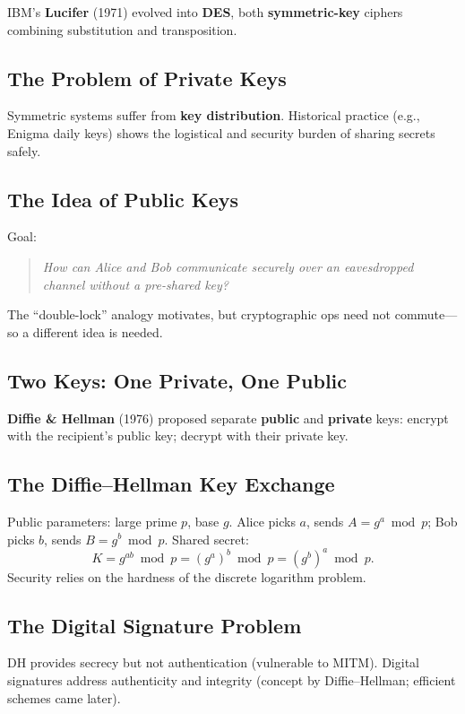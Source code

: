IBM’s \textbf{Lucifer} (1971) evolved into \textbf{DES}, both \textbf{symmetric-key} ciphers combining substitution and transposition.

\subsection{The Problem of Private Keys}

Symmetric systems suffer from \textbf{key distribution}. Historical practice (e.g., Enigma daily keys) shows the logistical and security burden of sharing secrets safely.

\subsection{The Idea of Public Keys}

Goal:
\begin{quote}
\textit{How can Alice and Bob communicate securely over an eavesdropped channel without a pre-shared key?}
\end{quote}
The “double-lock” analogy motivates, but cryptographic ops need not commute—so a different idea is needed.

\subsection{Two Keys: One Private, One Public}

\textbf{Diffie \& Hellman} (1976) proposed separate \textbf{public} and \textbf{private} keys: encrypt with the recipient’s public key; decrypt with their private key.

\subsection{The Diffie–Hellman Key Exchange}

Public parameters: large prime \(p\), base \(g\). Alice picks \(a\), sends \(A=g^a\bmod p\); Bob picks \(b\), sends \(B=g^b\bmod p\). Shared secret:
\[
K=g^{ab}\bmod p=(g^a)^b\bmod p=(g^b)^a\bmod p.
\]
Security relies on the hardness of the discrete logarithm problem.

\subsection{The Digital Signature Problem}

DH provides secrecy but not authentication (vulnerable to MITM). Digital signatures address authenticity and integrity (concept by Diffie–Hellman; efficient schemes came later).

